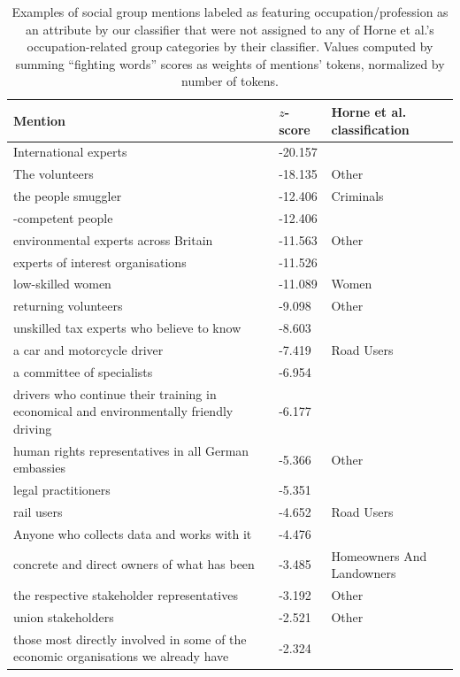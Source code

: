 \begin{table}[!th]
\centering
\caption{Examples of social group mentions labeled as featuring occupation/profession as an attribute by our classifier that were not assigned to any of Horne et al.'s occupation-related group categories by their classifier. Values computed by summing ``fighting words'' scores as weights of mentions' tokens, normalized by number of tokens.}
\label{tableC11}
\begin{tabular}{p{3in} l l}
\toprule
Mention & $z$-score & Horne et al. classification \\
\midrule
International experts & -20.157 &  \\
The volunteers & -18.135 & Other \\
the people smuggler & -12.406 & Criminals \\
-competent people & -12.406 &  \\
environmental experts across Britain & -11.563 & Other \\
experts of interest organisations & -11.526 &  \\
low-skilled women & -11.089 & Women \\
returning volunteers & -9.098 & Other \\
unskilled tax experts who believe to know & -8.603 &  \\
a car and motorcycle driver & -7.419 & Road Users \\
a committee of specialists & -6.954 &  \\
drivers who continue their training in economical and environmentally friendly driving & -6.177 &  \\
human rights representatives in all German embassies & -5.366 & Other \\
legal practitioners & -5.351 &  \\
rail users & -4.652 & Road Users \\
Anyone who collects data and works with it & -4.476 &  \\
concrete and direct owners of what has been & -3.485 & Homeowners And Landowners \\
the respective stakeholder representatives & -3.192 & Other \\
union stakeholders & -2.521 & Other \\
those most directly involved in some of the economic organisations we already have & -2.324 &  \\
\bottomrule
\end{tabular}
\end{table}
